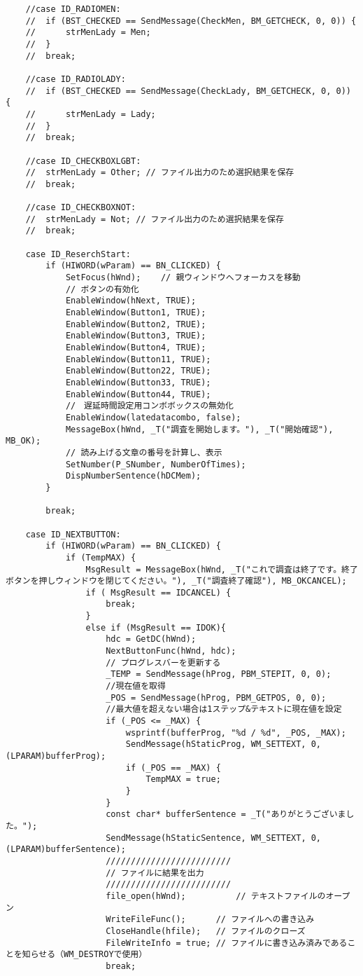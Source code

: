 \begin{verbatim}
	//case ID_RADIOMEN:
	//	if (BST_CHECKED == SendMessage(CheckMen, BM_GETCHECK, 0, 0)) {
	//		strMenLady = Men;
	//	}
	//	break;

	//case ID_RADIOLADY:
	//	if (BST_CHECKED == SendMessage(CheckLady, BM_GETCHECK, 0, 0)) {
	//		strMenLady = Lady; 
	//	}
	//	break;

	//case ID_CHECKBOXLGBT:
	//	strMenLady = Other; // ファイル出力のため選択結果を保存
	//	break;

	//case ID_CHECKBOXNOT:
	//	strMenLady = Not; // ファイル出力のため選択結果を保存
	//	break;

	case ID_ReserchStart:
		if (HIWORD(wParam) == BN_CLICKED) {
			SetFocus(hWnd);    // 親ウィンドウへフォーカスを移動
			// ボタンの有効化
			EnableWindow(hNext, TRUE);
			EnableWindow(Button1, TRUE);
			EnableWindow(Button2, TRUE);
			EnableWindow(Button3, TRUE);
			EnableWindow(Button4, TRUE);
			EnableWindow(Button11, TRUE);
			EnableWindow(Button22, TRUE);
			EnableWindow(Button33, TRUE);
			EnableWindow(Button44, TRUE);
			//　遅延時間設定用コンボボックスの無効化
			EnableWindow(latedatacombo, false);
			MessageBox(hWnd, _T("調査を開始します。"), _T("開始確認"), MB_OK);
			// 読み上げる文章の番号を計算し、表示
			SetNumber(P_SNumber, NumberOfTimes);
			DispNumberSentence(hDCMem);
		}
		
		break;
    
	case ID_NEXTBUTTON:
		if (HIWORD(wParam) == BN_CLICKED) {
			if (TempMAX) {
				MsgResult = MessageBox(hWnd, _T("これで調査は終了です。終了ボタンを押しウィンドウを閉じてください。"), _T("調査終了確認"), MB_OKCANCEL);
				if ( MsgResult == IDCANCEL) {
					break;
				}
				else if (MsgResult == IDOK){
					hdc = GetDC(hWnd);
					NextButtonFunc(hWnd, hdc);
					// プログレスバーを更新する
					_TEMP = SendMessage(hProg, PBM_STEPIT, 0, 0);
					//現在値を取得
					_POS = SendMessage(hProg, PBM_GETPOS, 0, 0);
					//最大値を超えない場合は1ステップ&テキストに現在値を設定
					if (_POS <= _MAX) {
						wsprintf(bufferProg, "%d / %d", _POS, _MAX);
						SendMessage(hStaticProg, WM_SETTEXT, 0, (LPARAM)bufferProg);
						if (_POS == _MAX) {
							TempMAX = true;
						}
					}
					const char* bufferSentence = _T("ありがとうございました。");
					SendMessage(hStaticSentence, WM_SETTEXT, 0, (LPARAM)bufferSentence);
					/////////////////////////
					// ファイルに結果を出力
					/////////////////////////
					file_open(hWnd);          // テキストファイルのオープン
					WriteFileFunc();      // ファイルへの書き込み
					CloseHandle(hfile);   // ファイルのクローズ
					FileWriteInfo = true; // ファイルに書き込み済みであることを知らせる（WM_DESTROYで使用）
					break;
					

\end{verbatim}
